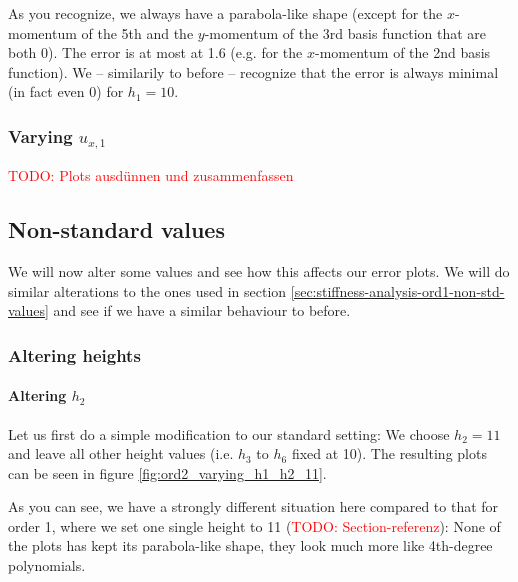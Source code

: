 \documentclass{article}
\newcommand{\todo}[1]{\textcolor{red}{TODO: #1}}
\begin{document}


As you recognize, we always have a parabola-like shape (except for the $x$-momentum of the 5th and the $y$-momentum of the 3rd basis function that are both 0). The error is at most at 1.6 (e.g. for the $x$-momentum of the 2nd basis function). We -- similarily to before -- recognize that the error is always minimal (in fact even 0) for $h_1=10$.

\subsubsection{Varying $u_{x,1}$}
\label{sec:stiffness-analysis-ord2-default-var-ux1}

\todo{Plots ausdünnen und zusammenfassen}



\subsection{Non-standard values}
\label{sec:stiffness-analysis-ord2-nondefault}

We will now alter some values and see how this affects our error plots. We will do similar alterations to the ones used in section \ref{sec:stiffness-analysis-ord1-non-std-values} and see if we have a similar behaviour to before.

\subsubsection{Altering heights}
\label{sec:stiffness-analysis-ord2-nondefault-altering-heights}

\paragraph{Altering $h_2$}

Let us first do a simple modification to our standard setting: We choose $h_2=11$ and leave all other height values (i.e. $h_3$ to $h_6$ fixed at 10). The resulting plots can be seen in figure \ref{fig:ord2_varying_h1_h2_11}. 



As you can see, we have a strongly different situation here compared to that for order 1, where we set one single height to 11 (\todo{Section-referenz}): None of the plots has kept its parabola-like shape, they look much more like 4th-degree polynomials.
\end{document}
